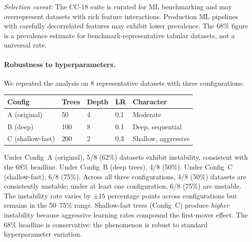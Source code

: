 \documentclass{article}
\begin{document}
\emph{Selection caveat:} The CC-18 suite is curated for ML benchmarking and may overrepresent datasets with rich feature interactions. Production ML pipelines with carefully decorrelated features may exhibit lower prevalence. The 68\% figure is a prevalence estimate for benchmark-representative tabular datasets, not a universal rate.

\paragraph{Robustness to hyperparameters.}
We repeated the analysis on 8 representative datasets with three configurations:

\begin{center}
\small
\begin{tabular}{@{}lllll@{}}
\toprule
Config & Trees & Depth & LR & Character \\
\midrule
A (original) & 50 & 4 & 0.1 & Moderate \\
B (deep) & 100 & 8 & 0.1 & Deep, sequential \\
C (shallow-fast) & 200 & 2 & 0.3 & Shallow, aggressive \\
\bottomrule
\end{tabular}
\end{center}

Under Config~A (original), 5/8 (62\%) datasets exhibit instability, consistent with the 68\% headline. Under Config~B (deep trees), 4/8 (50\%). Under Config~C (shallow-fast), 6/8 (75\%). Across all three configurations, 4/8 (50\%) datasets are consistently unstable; under at least one configuration, 6/8 (75\%) are unstable. The instability rate varies by $\pm 15$ percentage points across configurations but remains in the 50--75\% range. Shallow-fast trees (Config~C) produce \emph{higher} instability because aggressive learning rates compound the first-mover effect. The 68\% headline is conservative: the phenomenon is robust to standard hyperparameter variation.
\end{document}
